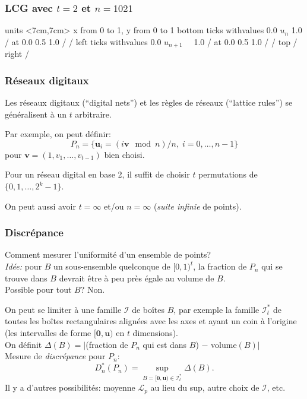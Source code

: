 \documentclass[t,usepdftitle=false]{beamer}
\def\bu{\boldsymbol{u}}
\def\bv{\boldsymbol{v}}
\def\bzero{\boldsymbol{0}}
\def\cI{\mathcal{I}}
\def\cL{\mathcal{L}}
\begin{document}
\begin{frame}[fragile]
\frametitle{LCG avec $t=2$ et $n=1021$}

\begin{center}
	\hskip 0.0000001cm
	\beginpicture
	\setcoordinatesystem units <7cm,7cm>
	\setplotarea x from 0 to 1, y from 0 to 1
	\axis bottom
	ticks withvalues     0.0  $u_n$  1.0 / at 0.0 0.5 1.0 / / 
	\axis left
	ticks withvalues     0.0  $u_{n+1}$~~  1.0 / at 0.0 0.5 1.0 / / 
	\axis top /  \axis right /
	
	\endpicture
\end{center}

\end{frame}

\begin{frame}
\frametitle{Réseaux digitaux}

Les r\'eseaux digitaux (``digital nets'') et les r\`egles de r\'eseaux
(``lattice rules'') se g\'en\'eralisent \`a un $t$ arbitraire.

\mbox{}

Par exemple, on peut d\'efinir:
\[
P_n = \{\bu_i = (i \bv \mod n)/n,\; i=0,\dots,n-1\}
\]
pour $\bv = (1,v_1,\dots,v_{t-1})$ bien choisi.

\mbox{}

Pour un r\'eseau digital en base 2, il suffit de choisir $t$ permutations
de $\{0,1,\dots,2^k-1\}$.

\mbox{}

On peut aussi avoir $t=\infty$ et/ou $n = \infty$ (\emph{suite infinie} de points).

\end{frame}

\begin{frame}
	\frametitle{Discr\'epance}
	
	Comment mesurer l'uniformit\'e d'un ensemble de points?\\
	\emph{Id\'ee:} pour ${B}$ un sous-ensemble quelconque de $[0,1)^t$,
	la fraction de $P_n$ qui se trouve dans $B$ devrait \^etre \`a peu 
	pr\`es \'egale au volume de $B$.\\
	Possible pour tout $B$? Non.
	
	
	On peut se limiter \`a une famille ${\cI}$ de bo\^{i}tes $B$, par exemple
	la famille ${\cI_t^*}$ de toutes les bo\^{i}tes rectangulaires align\'ees
	avec les axes et ayant un coin \`a l'origine (les intervalles
	de forme $[\bzero,\bu)$ en $t$ dimensions).\\
	On d\'efinit ${\Delta(B)} = |$(fraction de $P_n$ qui est dans $B$)
	$-$ volume$(B)|$\\
	Mesure de \emph{discr\'epance} pour $P_n$:
	\[
	{D_n^{*}(P_n)} = \sup_{B=[\bzero,\bu)\in \cI_t^*}  \Delta(B).
	\]
	Il y a d'autres possibilit\'es: moyenne $\cL_p$ au lieu du sup,
	autre choix de $\cI$, etc.
	
\end{frame}
\end{document}
